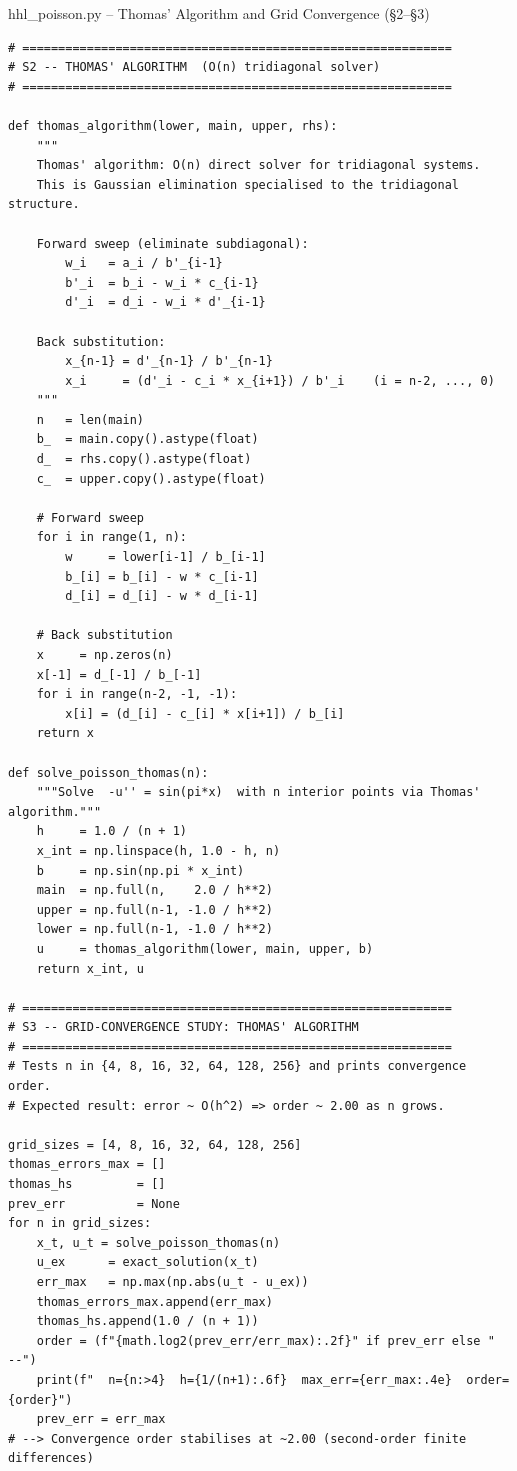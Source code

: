 \documentclass{beamer}
\begin{document}

\begin{frame}{hhl\_poisson.py -- Thomas' Algorithm and Grid Convergence (\S2--\S3)}
\begin{lstlisting}
# ============================================================
# S2 -- THOMAS' ALGORITHM  (O(n) tridiagonal solver)
# ============================================================

def thomas_algorithm(lower, main, upper, rhs):
    """
    Thomas' algorithm: O(n) direct solver for tridiagonal systems.
    This is Gaussian elimination specialised to the tridiagonal structure.

    Forward sweep (eliminate subdiagonal):
        w_i   = a_i / b'_{i-1}
        b'_i  = b_i - w_i * c_{i-1}
        d'_i  = d_i - w_i * d'_{i-1}

    Back substitution:
        x_{n-1} = d'_{n-1} / b'_{n-1}
        x_i     = (d'_i - c_i * x_{i+1}) / b'_i    (i = n-2, ..., 0)
    """
    n   = len(main)
    b_  = main.copy().astype(float)
    d_  = rhs.copy().astype(float)
    c_  = upper.copy().astype(float)

    # Forward sweep
    for i in range(1, n):
        w     = lower[i-1] / b_[i-1]
        b_[i] = b_[i] - w * c_[i-1]
        d_[i] = d_[i] - w * d_[i-1]

    # Back substitution
    x     = np.zeros(n)
    x[-1] = d_[-1] / b_[-1]
    for i in range(n-2, -1, -1):
        x[i] = (d_[i] - c_[i] * x[i+1]) / b_[i]
    return x

def solve_poisson_thomas(n):
    """Solve  -u'' = sin(pi*x)  with n interior points via Thomas' algorithm."""
    h     = 1.0 / (n + 1)
    x_int = np.linspace(h, 1.0 - h, n)
    b     = np.sin(np.pi * x_int)
    main  = np.full(n,    2.0 / h**2)
    upper = np.full(n-1, -1.0 / h**2)
    lower = np.full(n-1, -1.0 / h**2)
    u     = thomas_algorithm(lower, main, upper, b)
    return x_int, u

# ============================================================
# S3 -- GRID-CONVERGENCE STUDY: THOMAS' ALGORITHM
# ============================================================
# Tests n in {4, 8, 16, 32, 64, 128, 256} and prints convergence order.
# Expected result: error ~ O(h^2) => order ~ 2.00 as n grows.

grid_sizes = [4, 8, 16, 32, 64, 128, 256]
thomas_errors_max = []
thomas_hs         = []
prev_err          = None
for n in grid_sizes:
    x_t, u_t = solve_poisson_thomas(n)
    u_ex      = exact_solution(x_t)
    err_max   = np.max(np.abs(u_t - u_ex))
    thomas_errors_max.append(err_max)
    thomas_hs.append(1.0 / (n + 1))
    order = (f"{math.log2(prev_err/err_max):.2f}" if prev_err else "  --")
    print(f"  n={n:>4}  h={1/(n+1):.6f}  max_err={err_max:.4e}  order={order}")
    prev_err = err_max
# --> Convergence order stabilises at ~2.00 (second-order finite differences)
\end{lstlisting}
\end{frame}
\end{document}
